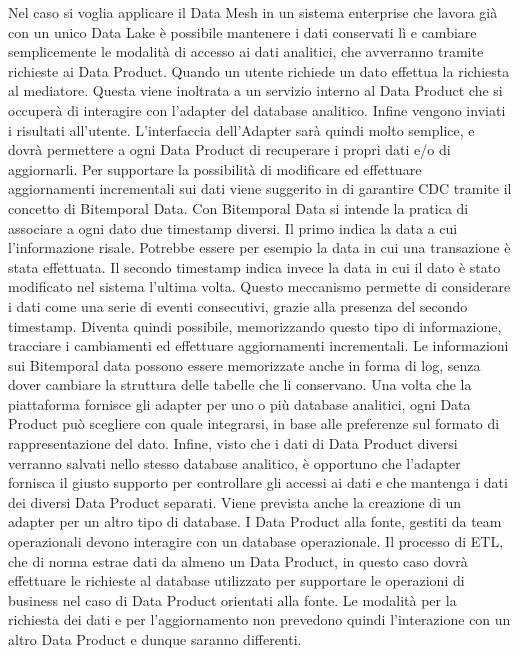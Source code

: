 \documentclass[12pt]{report}
\begin{document}
Nel caso si voglia applicare il Data Mesh in un sistema enterprise che lavora già con un unico Data Lake è possibile mantenere i dati conservati lì e cambiare semplicemente le modalità di accesso ai dati analitici, che avverranno tramite richieste ai Data Product.
Quando un utente richiede un dato effettua la richiesta al mediatore.
Questa viene inoltrata a un servizio interno al Data Product che si occuperà di interagire con l'adapter del database analitico. 
Infine vengono inviati i risultati all'utente.
L'interfaccia dell'Adapter sarà quindi molto semplice, e dovrà permettere a ogni Data Product di recuperare i propri dati e/o di aggiornarli.
Per supportare la possibilità di modificare ed effettuare aggiornamenti incrementali sui dati viene suggerito in \cite{zhamak_dehgani_data_2023,fowlerBitemporalNodate}
di garantire CDC tramite il concetto di Bitemporal Data.
Con Bitemporal Data si intende la pratica di associare a ogni dato due timestamp diversi. 
Il primo indica la data a cui l'informazione risale. 
Potrebbe essere per esempio la data in cui una transazione è stata effettuata.
Il secondo timestamp indica invece la data in cui il dato è stato modificato nel sistema l'ultima volta.
Questo meccanismo permette di considerare i dati come una serie di eventi consecutivi, grazie alla presenza del secondo timestamp.
Diventa quindi possibile, memorizzando questo tipo di informazione, tracciare i cambiamenti ed effettuare aggiornamenti incrementali.
Le informazioni sui Bitemporal data possono essere memorizzate anche in forma di log, senza dover cambiare la struttura delle tabelle che li conservano.
Una volta che la piattaforma fornisce gli adapter per uno o più database analitici, ogni Data Product può scegliere con quale integrarsi, in base alle preferenze sul formato di rappresentazione del dato.
Infine, visto che i dati di Data Product diversi verranno salvati nello stesso database analitico, è opportuno che l'adapter fornisca il giusto supporto per controllare gli accessi ai dati e che mantenga i dati dei diversi Data Product separati.
Viene prevista anche la creazione di un adapter per un altro tipo di database.
I Data Product alla fonte, gestiti da team operazionali devono interagire con un database operazionale.
Il processo di ETL, che di norma estrae dati da almeno un Data Product, in questo caso dovrà effettuare le richieste al database utilizzato per supportare le operazioni di business nel caso di Data Product orientati alla fonte.
Le modalità per la richiesta dei dati e per l'aggiornamento non prevedono quindi l'interazione con un altro Data Product e dunque saranno differenti.
\end{document}
